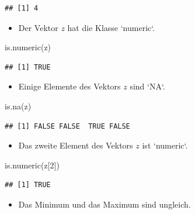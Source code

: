 \documentclass[12pt,a4paper]{article}
\newenvironment{Shaded}{\begin{snugshade}}{\end{snugshade}}
\newcommand{\DecValTok}[1]{\textcolor[rgb]{0.00,0.00,0.81}{#1}}
\newcommand{\FunctionTok}[1]{\textcolor[rgb]{0.00,0.00,0.00}{#1}}
\newcommand{\NormalTok}[1]{#1}
\begin{document}
\begin{verbatim}
## [1] 4
\end{verbatim}

\begin{itemize}
  \item Der Vektor $z$ hat die Klasse `numeric`.
\end{itemize}

\begin{Shaded}
\begin{Highlighting}[]
    \FunctionTok{is.numeric}\NormalTok{(z)}
\end{Highlighting}
\end{Shaded}

\begin{verbatim}
## [1] TRUE
\end{verbatim}

\begin{itemize}
  \item Einige Elemente des Vektors $z$ sind `NA`. 
\end{itemize}

\begin{Shaded}
\begin{Highlighting}[]
    \FunctionTok{is.na}\NormalTok{(z)}
\end{Highlighting}
\end{Shaded}

\begin{verbatim}
## [1] FALSE FALSE  TRUE FALSE
\end{verbatim}

\begin{itemize}
  \item Das zweite Element des Vektors $z$ ist `numeric`.
\end{itemize}

\begin{Shaded}
\begin{Highlighting}[]
    \FunctionTok{is.numeric}\NormalTok{(z[}\DecValTok{2}\NormalTok{])}
\end{Highlighting}
\end{Shaded}

\begin{verbatim}
## [1] TRUE
\end{verbatim}

\begin{itemize}
  \item Das Minimum und das Maximum sind ungleich. 
\end{itemize}
\end{document}
